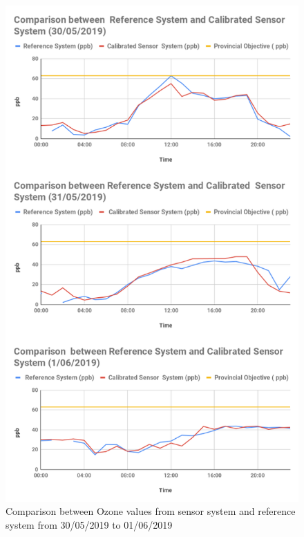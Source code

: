   \begin{figure}[h]
    \begin{center}
    \includegraphics[scale=0.46]{images/figure104.png}
    \end{center}
    \caption{Comparison between Ozone values from sensor system and reference system from 30/05/2019 to 01/06/2019}
    \label{Ozone}
  
  
  \end{figure}


